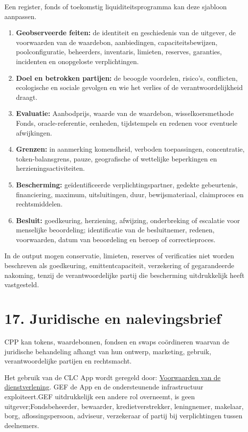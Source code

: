 \documentclass[11pt]{article}
\begin{document}
Een register, fonds of toekomstig liquiditeitsprogramma kan deze sjabloon aanpassen.

\begin{enumerate}[leftmargin=*]
\item \textbf{Geobserveerde feiten:} de identiteit en geschiedenis van de uitgever, de voorwaarden van de waardebon, aanbiedingen, capaciteitsbewijzen, poolconfiguratie, beheerders, inventaris, limieten, reserves, garanties, incidenten en onopgeloste verplichtingen.
\item \textbf{Doel en betrokken partijen:} de beoogde voordelen, risico's, conflicten, ecologische en sociale gevolgen en wie het verlies of de verantwoordelijkheid draagt.
\item \textbf{Evaluatie:} Aanbodprijs, waarde van de waardebon, wisselkoersmethode Fonds, oracle-referentie, eenheden, tijdstempels en redenen voor eventuele afwijkingen.
\item \textbf{Grenzen:} in aanmerking komendheid, verboden toepassingen, concentratie, token-balansgrens, pauze, geografische of wettelijke beperkingen en herzieningsactiviteiten.
\item \textbf{Bescherming:} geïdentificeerde verplichtingspartner, gedekte gebeurtenis, financiering, maximum, uitsluitingen, duur, bewijsmateriaal, claimproces en rechtsmiddelen.
\item \textbf{Besluit:} goedkeuring, herziening, afwijzing, onderbreking of escalatie voor menselijke beoordeling; identificatie van de besluitnemer, redenen, voorwaarden, datum van beoordeling en beroep of correctieproces.
\end{enumerate}
In de output mogen conservatie, limieten, reserves of verificaties niet worden beschreven als goedkeuring, emittentcapaciteit, verzekering of gegarandeerde nakoming, tenzij de verantwoordelijke partij die bescherming uitdrukkelijk heeft vastgesteld.


\section*{17. Juridische en nalevingsbrief}

CPP kan tokens, waardebonnen, fondsen en swaps coördineren waarvan de juridische behandeling afhangt van hun ontwerp, marketing, gebruik, verantwoordelijke partijen en rechtsmacht.

Het gebruik van de CLC App wordt geregeld door: \href{https://docs.cosmolocal.credit/nl-BE/governance/terms}{Voorwaarden van de dienstverlening}. GEF de App en de ondersteunende infrastructuur exploiteert.GEF uitdrukkelijk een andere rol overneemt, is geen uitgever;Fondsbeheerder, bewaarder, kredietverstrekker, leningnemer, makelaar, borg, aflossingspersoon, adviseur, verzekeraar of partij bij verplichtingen tussen deelnemers.
\end{document}
